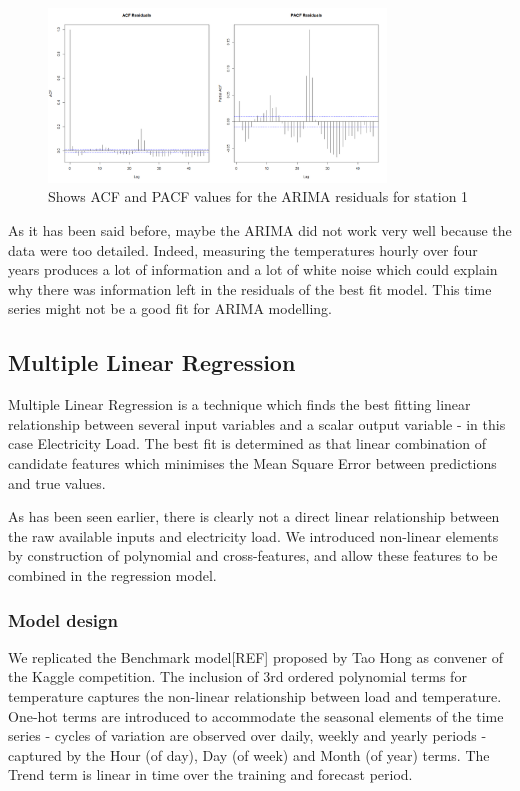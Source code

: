 \documentclass{article} %
\begin{document}
\begin{figure}[H]
  \centering
    \includegraphics[width=0.80\textwidth]{ACFandPACFTempArimaResults}
  \caption{Shows ACF and PACF values for the ARIMA residuals for station 1 }
\end{figure}

As it has been said before, maybe the ARIMA did not work very well because the data were too detailed. Indeed, measuring the temperatures hourly over four years produces a lot of information and a lot of white noise which could explain why there was information left in the residuals of the best fit model. This time series might not be a good fit for ARIMA modelling.

\subsection*{Multiple Linear Regression}
Multiple Linear Regression is a technique which finds the best fitting linear relationship between several input variables and a scalar output variable - in this case Electricity Load.  The best fit is determined as that linear combination of candidate features which minimises the Mean Square Error between predictions and true values.

As has been seen earlier, there is clearly not a direct linear relationship between the raw available inputs and electricity load.  We  introduced non-linear elements by construction of polynomial and cross-features, and allow these features to be combined in the regression model.

\subsubsection*{Model design}
We replicated the Benchmark model[REF] proposed by Tao Hong as convener of the Kaggle competition.  The inclusion of 3rd ordered polynomial terms for temperature captures the non-linear relationship between load and temperature.  One-hot terms are introduced to accommodate the seasonal elements of the time series - cycles of variation are observed over daily, weekly and yearly periods - captured by the Hour (of day), Day (of week) and Month (of year) terms.  The Trend term is linear in time over the training and forecast period.
\end{document}
